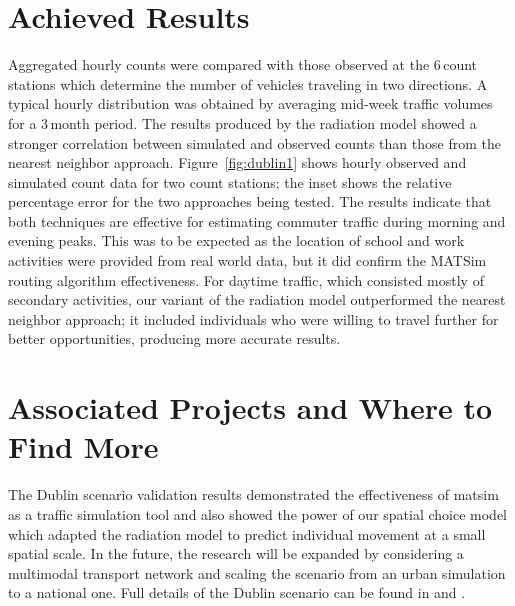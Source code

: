 \section{Achieved Results}
Aggregated hourly counts were compared with those observed at the 6\,count stations which determine the number of vehicles traveling in two directions. A typical hourly distribution was obtained by averaging mid-week traffic volumes for a 3\,month period. The results produced by the radiation model showed a stronger correlation between simulated and observed counts than those from the nearest neighbor approach. Figure~\ref{fig:dublin1} shows hourly observed and simulated count data for two count stations; the inset shows the relative percentage error for the two approaches being tested. The results indicate that both techniques are effective for estimating commuter traffic during morning and evening peaks. This was to be expected as the location of school and work activities were provided from real world data, but it did confirm the MATSim routing algorithm effectiveness. For daytime traffic, which consisted mostly of secondary activities, our variant of the radiation model outperformed the nearest neighbor approach; it included individuals who were willing to travel further for better opportunities, producing more accurate results.

\section{Associated Projects and Where to Find More}
The Dublin scenario validation results demonstrated the effectiveness of \gls{matsim} as a traffic simulation tool and also showed the power of our spatial choice model which adapted the radiation model to predict individual movement at a small spatial scale. In the future, the research will be expanded by considering a \gls{multimodal} transport network and scaling the scenario from an urban simulation to a national one. Full details of the Dublin scenario can be found in \citet[][]{McArdleEtAl_IWUC_2012} and \citet[][]{McArdleEtAl_ACMTIS_2014}.

